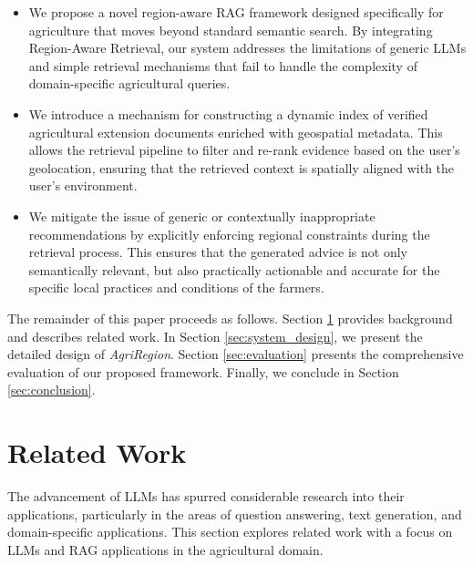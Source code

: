 \documentclass{ieeeaccess}
\newcommand{\AgriRegion}{\textit{AgriRegion}}
\begin{document}
\begin{itemize}
    \item We propose a novel region-aware RAG framework designed specifically for agriculture that moves beyond standard semantic search. By integrating Region-Aware Retrieval, our system addresses the limitations of generic LLMs and simple retrieval mechanisms that fail to handle the complexity of domain-specific agricultural queries.
    
    \item We introduce a mechanism for constructing a dynamic index of verified agricultural extension documents enriched with geospatial metadata. This allows the retrieval pipeline to filter and re-rank evidence based on the user’s geolocation, ensuring that the retrieved context is spatially aligned with the user's environment.
    
    \item We mitigate the issue of generic or contextually inappropriate recommendations by explicitly enforcing regional constraints during the retrieval process. This ensures that the generated advice is not only semantically relevant, but also practically actionable and accurate for the specific local practices and conditions of the farmers.
    
\end{itemize}
The remainder of this paper proceeds as follows. Section \ref{sec:related_work} provides background and describes related work. In Section \ref{sec:system_design}, we
present the detailed design of \AgriRegion. Section \ref{sec:evaluation} presents the
comprehensive evaluation of our proposed framework.
Finally, we conclude in Section \ref{sec:conclusion}.
\section{Related Work}
\label{sec:related_work}
The advancement of LLMs has spurred considerable research into their applications, particularly in the areas of question answering, text generation, and domain-specific applications. This section explores related work with a focus on  LLMs and RAG applications in the agricultural domain.
\end{document}
